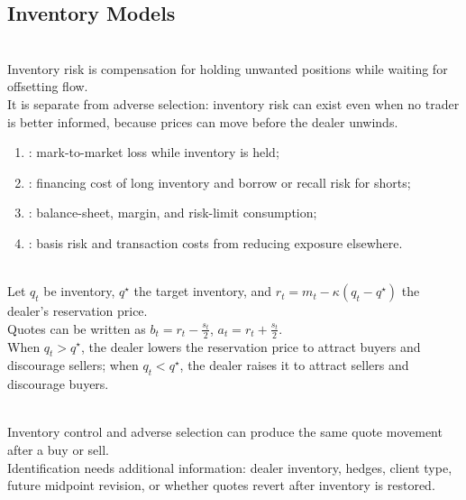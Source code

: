 \documentclass[a4paper,oneside,openany]{book}
\begin{document}
\subsection*{Inventory Models}

\begin{principle} \\
Inventory risk is compensation for holding unwanted positions while waiting for offsetting flow.\\
It is separate from adverse selection: inventory risk can exist even when no trader is better informed, because prices can move before the dealer unwinds.
\end{principle}

\begin{taxonomy} 
\begin{enumerate}[label=\roman*.]
\setlength{\itemsep}{0pt}
\item {}: mark-to-market loss while inventory is held;
\item {}: financing cost of long inventory and borrow or recall risk for shorts;
\item {}: balance-sheet, margin, and risk-limit consumption;
\item {}: basis risk and transaction costs from reducing exposure elsewhere.
\end{enumerate}
\end{taxonomy}

\begin{model} \\
Let $q_t$ be inventory, $q^\star$ the target inventory, and $r_t=m_t-\kappa(q_t-q^\star)$ the dealer's reservation price.\\
Quotes can be written as $b_t=r_t-\frac{s_t}{2}$, $a_t=r_t+\frac{s_t}{2}$.\\
When $q_t>q^\star$, the dealer lowers the reservation price to attract buyers and discourage sellers; when $q_t<q^\star$, the dealer raises it to attract sellers and discourage buyers.
\end{model}

\begin{caveat} \\
Inventory control and adverse selection can produce the same quote movement after a buy or sell.\\
Identification needs additional information: dealer inventory, hedges, client type, future midpoint revision, or whether quotes revert after inventory is restored.
\end{caveat}
\end{document}
